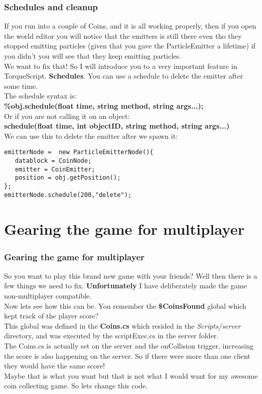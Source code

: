 \begin{frame}[fragile]
\frametitle{Schedules and cleanup}
If you run into a couple of Coins, and it is all working properly, then if you open the world editor you will notice that the emitters is still there even tho
they stopped emitting particles (given that you gave the ParticleEmitter a lifetime) if you didn't you will see that they keep emitting particles.\\
We want to fix that! So I will introduce you to a very important feature in TorqueScript. {\bf Schedules}. You can use a schedule to delete the emitter
after some time.\\
The schedule syntax is:\\
{\bf \%obj.schedule(float time, string method, string args...);}\\
Or if you are not calling it on an object:\\
{\bf schedule(float time, int objectID, string method, string args...)}\\
We can use this to delete the emitter after we spawn it:
\TS
\begin{lstlisting}
emitterNode =  new ParticleEmitterNode(){
   datablock = CoinNode;
   emitter = CoinEmitter;
   position = obj.getPosition();
};
emitterNode.schedule(200,"delete");
\end{lstlisting}
\end{frame}

\section{Gearing the game for multiplayer}
\begin{frame}
\frametitle{Gearing the game for multiplayer}
So you want to play this brand new game with your friends? Well then there is a few things we need to fix. 
{\bf Unfortunately} I have deliberately made the game non-multiplayer compatible.\\
Now lets see how this can be. You remember the {\bf \$CoinsFound} global which kept track of the player score?\\
This global was defined in the {\bf Coins.cs} which resided in the {\it Scripts/server} directory, and was executed by the scriptExec.cs in the server folder.\\
The Coins.cs is actually set on the server and the onCollision trigger, increasing the score is also happening on the server. So if there were more than one client
they would have the same score!\\
Maybe that is what you want but that is not what I would want for my awesome coin collecting game. So lets change this code.
\end{frame}

